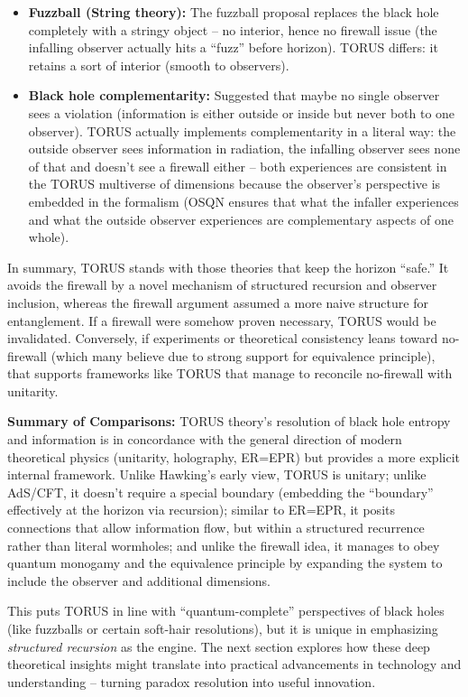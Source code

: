 \documentclass[]{article}
\begin{document}
\begin{itemize}
\item
  \textbf{Fuzzball (String theory):} The fuzzball proposal replaces the
  black hole completely with a stringy object -- no interior, hence no
  firewall issue (the infalling observer actually hits a ``fuzz'' before
  horizon). TORUS differs: it retains a sort of interior (smooth to
  observers).
\item
  \textbf{Black hole complementarity:} Suggested that maybe no single
  observer sees a violation (information is either outside or inside but
  never both to one observer). TORUS actually implements complementarity
  in a literal way: the outside observer sees information in radiation,
  the infalling observer sees none of that and doesn't see a firewall
  either -- both experiences are consistent in the TORUS multiverse of
  dimensions because the observer's perspective is embedded in the
  formalism (OSQN ensures that what the infaller experiences and what
  the outside observer experiences are complementary aspects of one
  whole).
\end{itemize}

In summary, TORUS stands with those theories that keep the horizon
``safe.'' It avoids the firewall by a novel mechanism of structured
recursion and observer inclusion, whereas the firewall argument assumed
a more naive structure for entanglement. If a firewall were somehow
proven necessary, TORUS would be invalidated. Conversely, if experiments
or theoretical consistency leans toward no-firewall (which many believe
due to strong support for equivalence principle), that supports
frameworks like TORUS that manage to reconcile no-firewall with
unitarity.

\textbf{Summary of Comparisons:} TORUS theory's resolution of black hole
entropy and information is in concordance with the general direction of
modern theoretical physics (unitarity, holography, ER=EPR) but provides
a more explicit internal framework. Unlike Hawking's early view, TORUS
is unitary; unlike AdS/CFT, it doesn't require a special boundary
(embedding the ``boundary'' effectively at the horizon via recursion);
similar to ER=EPR, it posits connections that allow information flow,
but within a structured recurrence rather than literal wormholes; and
unlike the firewall idea, it manages to obey quantum monogamy and the
equivalence principle by expanding the system to include the observer
and additional dimensions.

This puts TORUS in line with ``quantum-complete'' perspectives of black
holes (like fuzzballs or certain soft-hair resolutions), but it is
unique in emphasizing \emph{structured recursion} as the engine. The
next section explores how these deep theoretical insights might
translate into practical advancements in technology and understanding --
turning paradox resolution into useful innovation.
\end{document}
